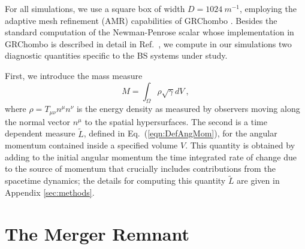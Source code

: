 \documentclass[11pt]{report}  %
\begin{document}
For all simulations, we use a square box of width $D = 1024~m^{-1}$, employing the adaptive mesh refinement (AMR) capabilities of GRChombo \cite{Radia:2021smk,Andrade:2021rbd,Clough:2015sqa}. Besides the standard computation of the Newman-Penrose scalar
whose implementation in GRChombo is described in detail in
Ref.~\cite{Radia:2021smk}, we compute in our simulations
two diagnostic quantities specific to the BS systems under study.

First, we introduce the mass measure 
 \begin{equation}
    M = \int_{\Omega} \rho \sqrt{\gamma} dV~,\label{eqn:Massmeasure}
\end{equation}
where $\rho = T_{\mu\nu}n^{\mu}n^{\nu}$ is the energy density as measured
by observers moving along the normal vector $n^\mu$ to the
spatial hypersurfaces. 
The second
is a time dependent
measure $\tilde{L}$, defined in Eq.~(\ref{eqn:DefAngMom}),
for the angular momentum contained
inside a specified volume $V$. This quantity is obtained
by adding to the initial angular momentum the time integrated
rate of change due to the source of momentum that crucially
includes contributions from the spacetime dynamics; the details
for computing this quantity $\tilde{L}$ are given in
Appendix \ref{sec:methods}.

\section{The Merger Remnant}\label{sec:Remannt}
\end{document}
